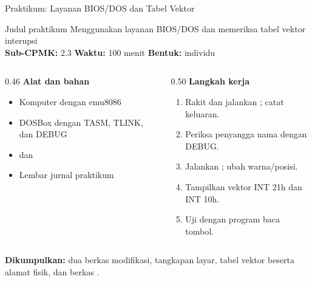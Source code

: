 \documentclass[aspectratio=169,11pt]{beamer}
\begin{document}
\begin{frame}{Praktikum: Layanan BIOS/DOS dan Tabel Vektor}
\begin{block}{Judul praktikum}
\small Menggunakan layanan BIOS/DOS dan memeriksa tabel vektor
interupsi\\[0.15em]
\textbf{Sub-CPMK:} 2.3 \quad\textbullet\quad
\textbf{Waktu:} 100 menit \quad\textbullet\quad
\textbf{Bentuk:} individu
\end{block}

\vspace{0.2em}
\begin{columns}[t]
\begin{column}{0.46\textwidth}
{\color{obeBlue}\bfseries Alat dan bahan}
\begin{itemize}\footnotesize
    \item Komputer dengan emu8086
    \item DOSBox dengan TASM, TLINK, dan DEBUG
    \item {} dan 
    \item Lembar jurnal praktikum
\end{itemize}
\end{column}
\begin{column}{0.50\textwidth}
{\color{obeBlue}\bfseries Langkah kerja}
\begin{enumerate}\footnotesize
    \item Rakit dan jalankan ; catat keluaran.
    \item Periksa penyangga nama dengan DEBUG.
    \item Jalankan ; ubah warna/posisi.
    \item Tampilkan vektor INT 21h dan INT 10h.
    \item Uji  dengan program baca tombol.
\end{enumerate}
\end{column}
\end{columns}

\vspace{0.2em}
{\footnotesize\textbf{Dikumpulkan:} dua berkas 
modifikasi, tangkapan layar, tabel vektor beserta alamat fisik, dan
berkas .\par}
\end{frame}
\end{document}
